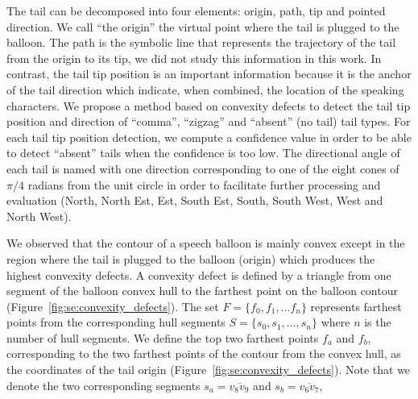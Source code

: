 


The tail can be decomposed into four elements: origin, path, tip and pointed direction.
We call ``the origin'' the virtual point where the tail is plugged to the balloon.
The path is the symbolic line that represents the trajectory of the tail from the origin to its tip, we did not study this information in this work.
In contrast, the tail tip position is an important information because it is the anchor of the tail direction which indicate, when combined, the location of the speaking characters.
We propose a method based on convexity defects to detect the tail tip position and direction of ``comma'', ``zigzag'' and ``absent'' (no tail) tail types.
For each tail tip position detection, we compute a confidence value in order to be able to detect ``absent'' tails when the confidence is too low.
The directional angle of each tail is named with one direction corresponding to one of the eight cones of $\pi/4$ radians from the unit circle in order to facilitate further processing and evaluation (North, North Est, Est, South Est, South, South West, West and North West).

We observed that the contour of a speech balloon is mainly convex except in the region where the tail is plugged to the balloon (origin) which produces the highest convexity defects.
A convexity defect is defined by a triangle from one segment of the balloon convex hull to the farthest point on the balloon contour (Figure~\ref{fig:se:convexity_defects}).
The set $F=\{f_0,f_1,...f_n\}$ represents farthest points from the corresponding hull segments $S=\{s_0, s_1,...,s_n\}$ where $n$ is the number of hull segments.
We define the top two farthest points $f_a$ and $f_b$, corresponding to the two farthest points of the contour from the convex hull, as the coordinates of the tail origin (Figure~\ref{fig:se:convexity_defects}).
Note that we denote the two corresponding segments $s_a=\overline{v_8v_9}$ and $s_b=\overline{v_6v_7}$,

